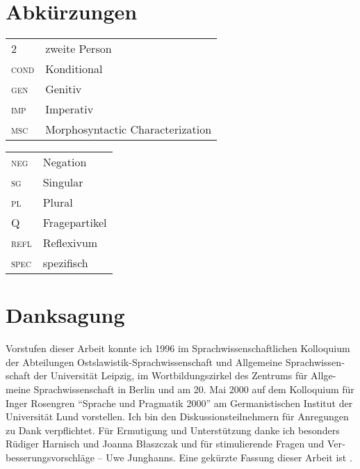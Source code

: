 \documentclass[output=paper, colorlinks, citecolor=brown, booklanguage=german]{langscibook}
\begin{document}
\begin{otherlanguage}{german}
\section*{Abkürzungen}

\begin{tabularx}{.45\textwidth}{@{}lQ@{}}
\textsc{2}&zweite Person\\
\textsc{cond}&Konditional\\
\textsc{gen}&Genitiv\\
\textsc{imp}&Imperativ\\
\textsc{msc}&Morphosyntactic Characterization\\
\end{tabularx}%
\begin{tabularx}{.45\textwidth}{@{}lQ@{}}
\textsc{neg}&Negation\\
\textsc{sg}&Singular\\
\textsc{pl}&Plural\\
\textsc{Q}&Fragepartikel\\
\textsc{refl}&Reflexivum\\
\textsc{spec}&spezifisch\\
\end{tabularx}



\section*{Danksagung}
Vorstufen dieser Arbeit konnte ich 1996 im Sprachwissenschaftlichen Kolloquium der Abteilungen Ostslawistik-Sprachwissenschaft und Allgemeine Sprachwissenschaft der Universität Leipzig, im Wortbildungszirkel des Zentrums für Allgemeine Sprachwissenschaft in Berlin und am 20. Mai 2000 auf dem Kolloquium für Inger Rosengren ``Sprache und Pragmatik 2000'' am Germanistischen Institut der Universität Lund vorstellen. Ich bin den Diskussionsteilnehmern für Anregungen zu Dank verpflichtet. Für Ermutigung und Unterstützung danke ich besonders Rüdiger Harnisch und Joanna Błaszczak und für stimulierende Fragen und Verbesserungsvorschläge -- Uwe Junghanns. Eine gekürzte Fassung dieser Arbeit ist \citet{zi02:Zimmermann2000}.


\end{otherlanguage}
\end{document}
